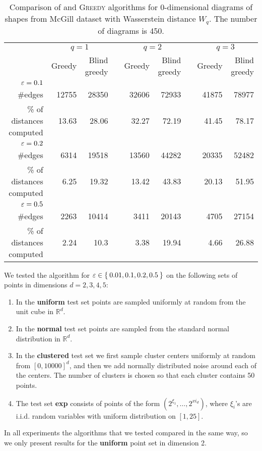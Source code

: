 \documentclass[a4paper,UKenglish,cleveref, autoref]{lipics-v2019}
\begin{document}
\begin{table}\centering
    \begin{tabular}{@{}rrrcrrcrr@{}}\toprule
                          & \multicolumn{2}{c}{$q=1$} & \phantom{abc} & \multicolumn{2}{c}{$q=2$} & \phantom{abc} & \multicolumn{2}{c}{$q=3$}\\
                          \cmidrule{2-3} \cmidrule{5-6} \cmidrule{8-9}
                          & Greedy & Blind greedy && Greedy & Blind greedy && Greedy & Blind greedy \\ \midrule
$\varepsilon = 0.1$\\
\#edges                    & 12755 & 28350         && 32606 & 72933      &&  41875  & 78977 \\
\% of distances computed   & 13.63 & 28.06         && 32.27 & 72.19      &&   41.45  & 78.17 \\
$\varepsilon = 0.2$\\
\#edges                    & 6314 & 19518         && 13560 & 44282       &&  20335  & 52482 \\
\% of distances computed   & 6.25 & 19.32         && 13.42 & 43.83       &&   20.13  & 51.95 \\
$\varepsilon = 0.5$\\
\#edges                    & 2263 & 10414         && 3411 & 20143        &&  4705  & 27154 \\
\% of distances computed   & 2.24 & 10.3          && 3.38 & 19.94        &&   4.66  & 26.88 \\
\bottomrule
\end{tabular}
\caption{Comparison of \bgrdy and \textsc{Greedy} algorithms for 0-dimensional
diagrams of shapes from McGill dataset with Wasserstein distance $W_q$. The number of diagrams is 450.}
\label{tbl:mcgill_original_blind_greedy_spanner}
\end{table}


We tested the algorithm for $\varepsilon \in \Set{0.01, 0.1, 0.2, 0.5}$ on the following sets of points in dimensions $d = 2,3,4,5$:
\begin{enumerate}
    \item In the \textbf{uniform} test set points are sampled uniformly at
        random from the unit cube in $\mathbb{R}^d$.
    \item In the \textbf{normal} test set points are sampled from the standard
        normal distribution in $\mathbb{R}^d$.
    \item In the \textbf{clustered} test set we first sample cluster centers uniformly 
        at random from $[0,10000]^d$, and then we add normally distributed noise around
        each of the centers. The number of clusters is chosen so that each cluster
        contains 50 points.
    \item The test set \textbf{exp} consists of points of the form $(2^{\xi_1}, \dots, 2^{xi_d})$,
        where $\xi_i$'s are i.i.d. random variables with uniform distribution on $[1,25]$.
\end{enumerate}
In all experiments the algorithms that we tested compared in the same way,
so we only present results for the \textbf{uniform} point set in dimension 2.
\end{document}
